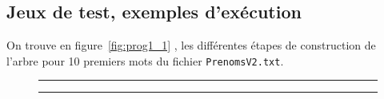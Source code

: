 \documentclass{article} %
\begin{document}
\subsection{Jeux de test, exemples d'exécution}
On trouve en figure~\ref{fig:prog1_1} , les différentes étapes de construction de l'arbre pour 10 premiers mots du fichier \texttt{PrenomsV2.txt}. 

\begin{figure}[p]
  
  \begin{center}
    \rule{\linewidth}{.5pt}
     \vline
     \vline
     \rule{\linewidth}{.5pt} %

\end{center}
\end{figure}
\end{document}
